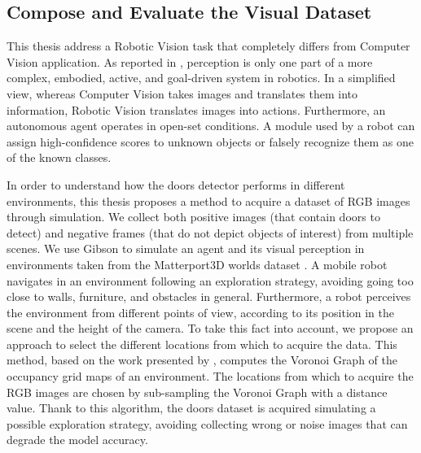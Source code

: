 \subsection{Compose and Evaluate the Visual Dataset}
This thesis address a Robotic Vision task that completely differs from Computer Vision application. As reported in \cite{surveydeeplimits}, perception is only one part of a more complex, embodied, active, and goal-driven system in robotics.
In a simplified view, whereas Computer Vision takes images and translates them into information, Robotic Vision translates images into actions. Furthermore, an autonomous agent operates in open-set conditions. A module used by a robot can assign high-confidence scores to unknown objects or falsely recognize them as one of the known classes. 

In order to understand how the doors detector performs in different environments, this thesis proposes a method to acquire a dataset of RGB images through simulation. We collect both positive images (that contain doors to detect) and negative frames (that do not depict objects of interest) from multiple scenes. We use Gibson \cite{gibson} to simulate an agent and its visual perception in environments taken from the Matterport3D worlds dataset \cite{matterport}. A mobile robot navigates in an environment following an exploration strategy, avoiding going too close to walls, furniture, and obstacles in general. Furthermore, a robot perceives the environment from different points of view, according to its position in the scene and the height of the camera. To take this fact into account, we propose an approach to select the different locations from which to acquire the data. This method, based on the work presented by \citeauthor{repeatabilityslamarxiv} \cite{repeatabilityslamarxiv, repeatabilityslam}, computes the Voronoi Graph of the occupancy grid maps of an environment. The locations from which to acquire the RGB images are chosen by sub-sampling the Voronoi Graph with a distance value. Thank to this algorithm, the doors dataset is acquired simulating a possible exploration strategy, avoiding collecting wrong or noise images that can degrade the model accuracy.

